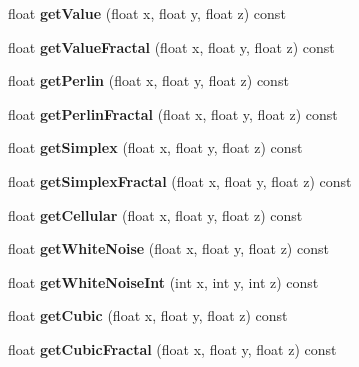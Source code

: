 \begin{DoxyCompactItemize}
float {\bfseries get\+Value} (float x, float y, float z) const
\item 
\mbox{\label{classnoisefast_a74ad2af97fea9f5cf1fdbac57c8d1d79}} 
float {\bfseries get\+Value\+Fractal} (float x, float y, float z) const
\item 
\mbox{\label{classnoisefast_a822dc3be43c71419d0b211e7b4a667ac}} 
float {\bfseries get\+Perlin} (float x, float y, float z) const
\item 
\mbox{\label{classnoisefast_a82980450fd52efb629ae084f651d5e1b}} 
float {\bfseries get\+Perlin\+Fractal} (float x, float y, float z) const
\item 
\mbox{\label{classnoisefast_a5c7f2341d8abb1dd11ebd68bf324556a}} 
float {\bfseries get\+Simplex} (float x, float y, float z) const
\item 
\mbox{\label{classnoisefast_ab4dd7ec6e8d788e1fdf817f2419f4d6c}} 
float {\bfseries get\+Simplex\+Fractal} (float x, float y, float z) const
\item 
\mbox{\label{classnoisefast_ab62657c35c61d29a650dac895f560323}} 
float {\bfseries get\+Cellular} (float x, float y, float z) const
\item 
\mbox{\label{classnoisefast_a42a470e7a75d1f6a828bd4e160126af0}} 
float {\bfseries get\+White\+Noise} (float x, float y, float z) const
\item 
\mbox{\label{classnoisefast_a2bb130b99daaa1e9b0a39848aed3e97e}} 
float {\bfseries get\+White\+Noise\+Int} (int x, int y, int z) const
\item 
\mbox{\label{classnoisefast_aa27a2d0ffd0d67332170bcff5a27b121}} 
float {\bfseries get\+Cubic} (float x, float y, float z) const
\item 
\mbox{\label{classnoisefast_a1ba6df3bba749b3394c88f61e1f08e7a}} 
float {\bfseries get\+Cubic\+Fractal} (float x, float y, float z) const
\item 
\mbox{\label{classnoisefast_a74274922701840ffed996dabf7a96325}} 

\end{DoxyCompactItemize}
